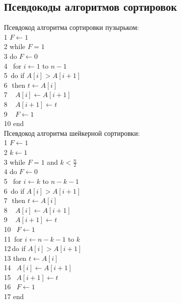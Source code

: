 \documentclass[a4paper,12pt]{article}
\begin{document}
\newpage
\subsection{Псевдокоды алгоритмов сортировок}
Псевдокод алгоритма сортировки пузырьком:\\
1 $F \leftarrow 1$ \\
2 while $F = 1$	\\
3 \quad do $F \leftarrow 0$\\
4 \quad\,  for $i \leftarrow 1$ to $n - 1$ \\
5 \quad\,\quad do if $A[i] > A[i + 1]$\\
6 \quad\,\quad\,\quad  then $t \leftarrow A[i]$\\
7 \quad\,\quad\,\quad\, $A[i] \leftarrow A[i + 1]$\\
8 \quad\,\quad\,\quad\, $A[i + 1] \leftarrow t$\\
9 \quad\,\quad\,\quad\, $F \leftarrow 1$ \\
10 end\\

Псевдокод алгоритма шейкерной сортировки:\\
1 $F \leftarrow 1$ \\
2 $k \leftarrow 1$ \\
3 while $F = 1$ and $k < \frac{n}{2}$\\
4 \quad do $F \leftarrow 0$\\
5 \quad\, for $i \leftarrow k$ to $n - k - 1$\\
6 \quad\,\quad do if $A[i] > A[i + 1]$\\
7 \quad\,\quad\,\quad then $t \leftarrow A[i]$\\
8 \quad\,\quad\,\quad\, $A[i] \leftarrow A[i + 1]$\\
9 \quad\,\quad\,\quad\, $A[i + 1] \leftarrow t$\\
10\quad\,\quad\,\quad\, $F \leftarrow 1$\\
11\quad\, for $i \leftarrow n - k - 1$ to $k$\\
12\quad\,\quad do if $A[i] > A[i + 1]$\\
13\quad\,\quad\,\quad then $t \leftarrow A[i]$\\
14\quad\,\quad\,\quad\, $A[i] \leftarrow A[i + 1]$\\
15\quad\,\quad\,\quad\, $A[i + 1] \leftarrow t$\\
16\quad\,\quad\,\quad\, $F \leftarrow 1$\\
17 end\\
\end{document}
